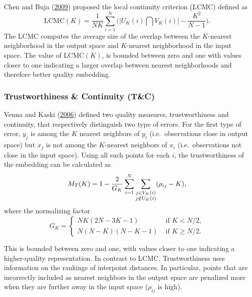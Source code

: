 \documentclass[12pt]{article}
\begin{document}
Chen and Buja (\protect\hyperlink{ref-Chen2009-su}{2009}) proposed the local continuity criterion (LCMC) defined as
\begin{equation}\label{eq:LCMC}
  \text{LCMC}(K)=\frac{1}{N K} \sum_{i=1}^{N}\Big(\big| U_K(i) \bigcap V_K(i) \big| - \frac{K^{2}}{N-1}\Big).
\end{equation}
The LCMC computes the average size of the overlap between the \(K\)-nearest neighborhood in the output space and \(K\)-nearest neighborhood in the input space. The value of LCMC\((K)\), is bounded between zero and one with values closer to one indicating a larger overlap between nearest neighborhoods and therefore better quality embedding.

\hypertarget{trustworthiness-continuity-tc}{%
\subsubsection*{Trustworthiness \& Continuity (T\&C)}\label{trustworthiness-continuity-tc}}

Venna and Kaski (\protect\hyperlink{ref-Venna2006-nd}{2006}) defined two quality measures, trustworthiness and continuity, that respectively distinguish two type of errors. For the first type of error, \(y_j\) is among the \(K\) nearest neighbors of \(y_i\) (i.e.~observations close in output space) but \(x_j\) is not among the \(K\)-nearest neighbors of \(x_i\) (i.e.~observations not close in the input space). Using all such points for each \(i\), the trustworthiness of the embedding can be calculated as
\begin{equation}\label{eq:trustworthiness}
  M_{T}(K)=1-\frac{2}{G_{K}} \sum_{i=1}^{N} \sum\limits_{\begin{subarray}{c}j \in V_{K}(i)\\j \notin U_{K}(i)\end{subarray}}(\rho_{ij}-K),
\end{equation}
where the normalizing factor
\[
  G_{K}=\left\{
    \begin{array}{ll}
      N K(2 N-3 K-1) & \text { if } K<N / 2, \\
      N(N-K)(N-K-1) & \text { if } K \geq N / 2.
    \end{array}
  \right.
\]

This is bounded between zero and one, with values closer to one indicating a higher-quality representation. In contrast to LCMC, Trustworthiness uses information on the rankings of interpoint distances. In particular, points that are incorrectly included as nearest neighbors in the output space are penalized more when they are further away in the input space (\(\rho_{ij}\) is high).
\end{document}
